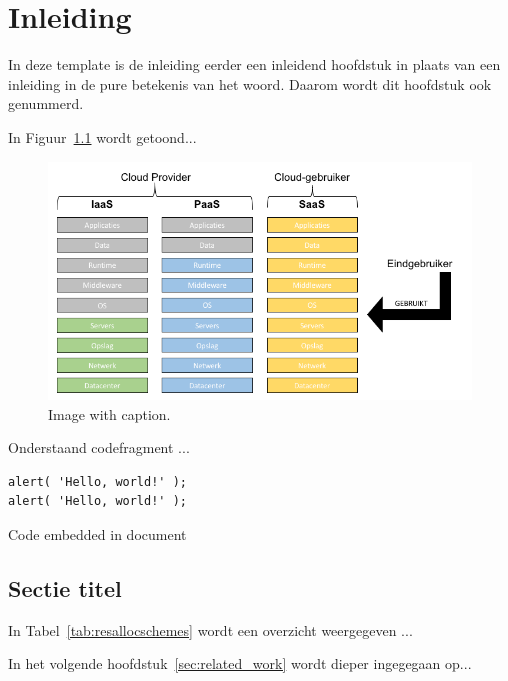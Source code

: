\chapter{Inleiding}
\label{chap:intro}

In deze template is de inleiding eerder een inleidend hoofdstuk in plaats van een inleiding in de pure betekenis van het woord. Daarom wordt dit hoofdstuk ook genummerd.

In Figuur~\ref{fig:cloud_rollen} wordt getoond...

\begin{figure}[h]
	\centering
	\includegraphics[width=\textwidth]{images/cloud_rollen.png}
	\caption{Image with caption.}
	\label{fig:cloud_rollen}
\end{figure}

Onderstaand codefragment ...

\begin{listing}[!h]
\begin{verbatim}
alert( 'Hello, world!' );
alert( 'Hello, world!' );
\end{verbatim}
\caption{Code embedded in document}
\end{listing}



\section{Sectie titel}

In Tabel~\ref{tab:resallocschemes} wordt een overzicht weergegeven ...

\begin{table}[h]
	\centering
	\captionsetup{justification=centering}
	\caption[Overzicht resource-allocatieschema's]{Overzicht resource-allocatieschema's}
	\label{tab:resallocschemes}
\end{table}

In het volgende hoofdstuk~\ref{sec:related_work} wordt dieper ingegegaan op...

